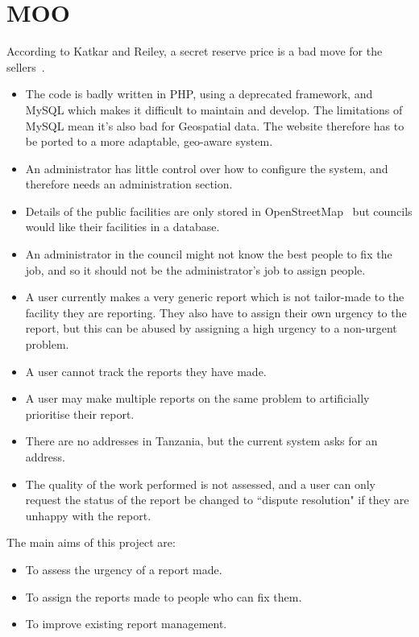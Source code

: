 \section{MOO}
According to Katkar and Reiley, a secret reserve price is a bad move for the sellers~\cite{ebaypubsec}.
\begin{itemize}
\item The code is badly written in PHP, using a deprecated framework, and MySQL which makes it difficult to maintain and develop. The limitations of MySQL mean it's also bad for Geospatial data. The website therefore has to be ported to a more adaptable, geo-aware system.
\item An administrator has little control over how to configure the system, and therefore needs an administration section.
\item Details of the public facilities are only stored in OpenStreetMap~\cite{openstreetmap} but councils would like their facilities in a database.
\item An administrator in the council might not know the best people to fix the job, and so it should not be the administrator's job to assign people.
\item A user currently makes a very generic report which is not tailor-made to the facility they are reporting. They also have to assign their own urgency to the report, but this can be abused by assigning a high urgency to a non-urgent problem.
\item A user cannot track the reports they have made.
\item A user may make multiple reports on the same problem to artificially prioritise their report.
\item There are no addresses in Tanzania, but the current system asks for an address.
\item The quality of the work performed is not assessed, and a user can only request the status of the report be changed to ``dispute resolution" if they are unhappy with the report.
\end{itemize}
The main aims of this project are:

\begin{itemize}
\item To assess the urgency of a report made.
\item To assign the reports made to people who can fix them.
\item To improve existing report management.
\end{itemize}

